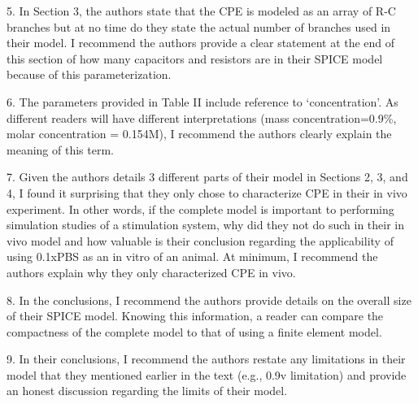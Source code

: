 \documentclass[journal, a4paper]{IEEEtran}
\begin{document}
{    5. In Section 3, the authors state that the CPE is modeled as an array of R-C branches but at no time do they state the actual number of branches used in their model. I recommend the authors provide a clear statement at the end of this section of how many capacitors and resistors are in their SPICE model because of this parameterization.

    6. The parameters provided in Table II include reference to `concentration'. As different readers will have different interpretations (mass concentration=0.9\%, molar concentration = 0.154M), I recommend the authors clearly explain the meaning of this term.

    7. Given the authors details 3 different parts of their model in Sections 2, 3, and 4, I found it surprising that they only chose to characterize CPE in their in vivo experiment. In other words, if the complete model is important to performing simulation studies of a stimulation system, why did they not do such in their in vivo model and how valuable is their conclusion regarding the applicability of using 0.1xPBS as an in vitro of an animal. At minimum, I recommend the authors explain why they only characterized CPE in vivo.

    8. In the conclusions, I recommend the authors provide details on the overall size of their SPICE model. Knowing this information, a reader can compare the compactness of the complete model to that of using a finite element model.

    9. In their conclusions, I recommend the authors restate any limitations in their model that they mentioned earlier in the text (e.g., 0.9v limitation) and provide an honest discussion regarding the limits of their model.
}
\end{document}
